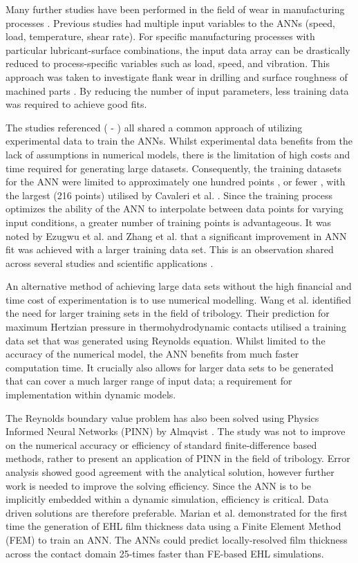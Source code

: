 Many further studies have been performed in the field of wear in manufacturing processes \cite{Ripa2004}. Previous studies had multiple input variables to the ANNs (speed, load, temperature, shear rate). For specific manufacturing processes with particular lubricant-surface combinations, the input data array can be drastically reduced to process-specific variables such as load, speed, and vibration. This approach was taken to investigate flank wear in drilling \cite{Panda2008} and surface roughness of machined parts \cite{Asilturk2011}. By reducing the number of input parameters, less training data was required to achieve good fits.

The studies referenced (\cite{Ezugwu1995} - \cite{Asilturk2011}) all shared a common approach of utilizing experimental data to train the ANNs. Whilst experimental data benefits from the lack of assumptions in numerical models, there is the limitation of high costs and time required for generating large datasets. Consequently, the training datasets for the ANN were limited to approximately one hundred points \cite{Zhang2002} \cite{Hayajneh2009}, or fewer \cite{Ezugwu1995} \cite{Rutherford1996}, with the largest (216 points) utilised by Cavaleri et al. \cite{Cavaleri2019}. Since the training process optimizes the ability of the ANN to interpolate between data points for varying input conditions, a greater number of training points is advantageous. It was noted by Ezugwu et al. \cite{Ezugwu1995} and Zhang et al. \cite{Zhang2002} that a significant improvement in ANN fit was achieved with a larger training data set. This is an observation shared across several studies and scientific applications \cite{Barbedo2018}.

An alternative method of achieving large data sets without the high financial and time cost of experimentation is to use numerical modelling. Wang et al. \cite{Wang2020} identified the need for larger training sets in the field of tribology. Their prediction for maximum Hertzian pressure in thermohydrodynamic contacts utilised a training data set that was generated using Reynolds equation. Whilst limited to the accuracy of the numerical model, the ANN benefits from much faster computation time. It crucially also allows for larger data sets to be generated that can cover a much larger range of input data; a requirement for implementation within dynamic models.

The Reynolds boundary value problem has also been solved using Physics Informed Neural Networks (PINN) by Almqvist \cite{Almqvist2021}. The study was not to improve on the numerical accuracy or efficiency of standard finite-difference based methods, rather to present an application of PINN in the field of tribology. Error analysis showed good agreement with the analytical solution, however further work is needed to improve the solving efficiency. Since the ANN is to be implicitly embedded within a dynamic simulation, efficiency is critical. Data driven solutions are therefore preferable. Marian et al. \cite{Marian2022} demonstrated for the first time the generation of EHL film thickness data using a Finite Element Method (FEM) to train an ANN. The ANNs could predict locally-resolved film thickness across the contact domain 25-times faster than FE-based EHL simulations.

